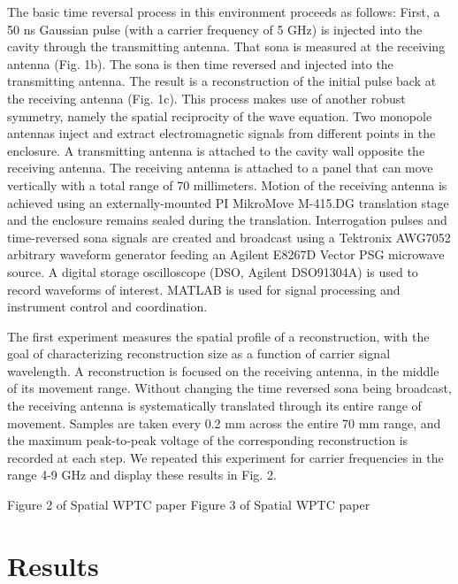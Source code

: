 The basic time reversal process in this environment proceeds as follows: First, a 50 ns Gaussian pulse (with a carrier frequency of 5 GHz) is injected into the cavity through the transmitting antenna. That sona is measured at the receiving antenna (Fig. 1b). The sona is then time reversed and injected into the transmitting antenna. The result is a reconstruction of the initial pulse back at the receiving antenna (Fig. 1c). This process makes use of another robust symmetry, namely the spatial reciprocity of the wave equation.
Two monopole antennas inject and extract electromagnetic signals from different points in the enclosure. A transmitting antenna is attached to the cavity wall opposite the receiving antenna. The receiving antenna is attached to a panel that can move vertically with a total range of 70 millimeters. Motion of the receiving antenna is achieved using an externally-mounted PI MikroMove M-415.DG translation stage and the enclosure remains sealed during the translation. Interrogation pulses and time-reversed sona signals are created and broadcast using a Tektronix AWG7052 arbitrary waveform generator feeding an Agilent E8267D Vector PSG microwave source. A digital storage oscilloscope (DSO, Agilent DSO91304A) is used to record waveforms of interest. MATLAB is used for signal processing and instrument control and coordination.

The first experiment measures the spatial profile of a reconstruction, with the goal of characterizing reconstruction size as a function of carrier signal wavelength. A reconstruction is focused on the receiving antenna, in the middle of its movement range. Without changing the time reversed sona being broadcast, the receiving antenna is systematically translated through its entire range of movement. Samples are taken every 0.2 mm across the entire 70 mm range, and the maximum peak-to-peak voltage of the corresponding reconstruction is recorded at each step. We repeated this experiment for carrier frequencies in the range 4-9 GHz and display these results in Fig. 2.

{Figure 2 of Spatial WPTC paper}
{Figure 3 of Spatial WPTC paper}

\section{Results}
\label{sec:spatial-profile-results}


